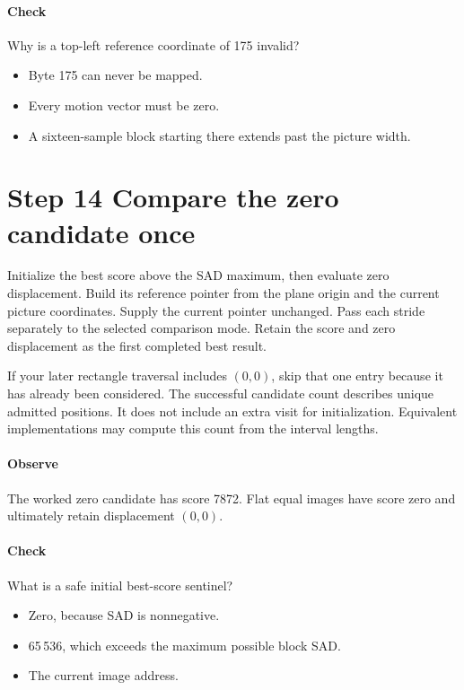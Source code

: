 \paragraph{Check} Why is a top-left reference coordinate of 175 invalid?
\begin{itemize}
  \item[A.] Byte 175 can never be mapped.
  \item[B.] Every motion vector must be zero.
  \item[C.] A sixteen-sample block starting there extends past the picture width.
\end{itemize}

\section{Step 14 Compare the zero candidate once}\label{h263-motion-s04}
Initialize the best score above the SAD maximum, then evaluate zero displacement.
Build its reference pointer from the plane origin and the current picture
coordinates. Supply the current pointer unchanged. Pass each stride separately
to the selected comparison mode. Retain the score and zero displacement as the
first completed best result.

If your later rectangle traversal includes $(0,0)$, skip that one entry because
it has already been considered. The successful candidate count describes unique
admitted positions. It does not include an extra visit for initialization.
Equivalent implementations may compute this count from the interval lengths.

\paragraph{Observe} The worked zero candidate has score 7872. Flat equal images
have score zero and ultimately retain displacement $(0,0)$.
\paragraph{Check} What is a safe initial best-score sentinel?
\begin{itemize}
  \item[A.] Zero, because SAD is nonnegative.
  \item[B.] 65\,536, which exceeds the maximum possible block SAD.
  \item[C.] The current image address.
\end{itemize}


